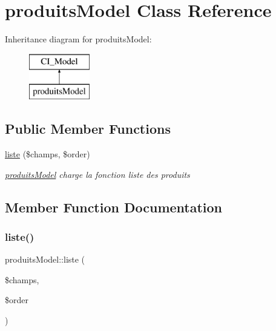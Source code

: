 \hypertarget{classproduits_model}{}\section{produits\+Model Class Reference}
\label{classproduits_model}
Inheritance diagram for produits\+Model\+:\begin{figure}[H]
\begin{center}
\leavevmode
\includegraphics[height=2.000000cm]{classproduits_model}
\end{center}
\end{figure}
\subsection*{Public Member Functions}
\begin{DoxyCompactItemize}
\item 
\mbox{\hyperlink{classproduits_model_a30ee1b01c0e13b02593a506943230c8f}{liste}} (\$champs, \$order)
\begin{DoxyCompactList}\small\item\em \mbox{\hyperlink{classproduits_model}{produits\+Model}} charge la fonction liste des produits \end{DoxyCompactList}\end{DoxyCompactItemize}


\subsection{Member Function Documentation}
\mbox{\label{classproduits_model_a30ee1b01c0e13b02593a506943230c8f}} 
\subsubsection{\texorpdfstring{liste()}{liste()}}
{\footnotesize\ttfamily produits\+Model\+::liste (\begin{DoxyParamCaption}\item[{}]{\$champs,  }\item[{}]{\$order }\end{DoxyParamCaption})}



